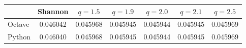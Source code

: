\begin{tabular}{lcccccc}
\toprule
 & Shannon & $q=1.5$ & $q=1.9$ & $q=2.0$ & $q=2.1$ & $q=2.5$ \\
\midrule
Octave & 0.046042 & 0.045968 & 0.045945 & 0.045944 & 0.045945 & 0.045969 \\
Python & 0.046040 & 0.045968 & 0.045945 & 0.045944 & 0.045945 & 0.045969 \\
\bottomrule
\end{tabular}
